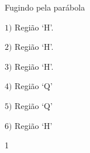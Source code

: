 \begin{answer}{Fugindo pela parábola}
{\begin{multicols}{3}
\centering

\(1)\) Região ‘H’.

\(2)\) Região ‘H’.

\(3)\) Região ‘H’.

\(4)\) Região ‘Q’

\(5)\) Região ‘Q’

\(6)\) Região ‘H’
\end{multicols}

}{1}
\end{answer}

\label{\detokenize{AF209-6:sec-funcao-quadratica-praticando-parabola-lg}}\label{\detokenize{AF209-6:praticando}}
\phantom{a}
\vspace{-1em}
\vspace{-3\parskip}

